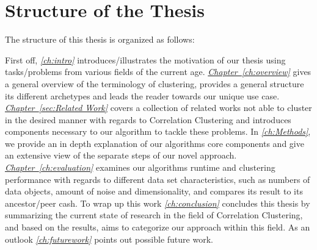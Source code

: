 \section{Structure of the Thesis}
The structure of this thesis is organized as follows:

First off, \textit{\autoref{ch:intro}} introduces/illustrates the motivation of our thesis using tasks/problems from various fields of the current age.
\textit{\hyperref[ch:overview]{Chapter~\ref*{ch:overview}}} gives a general overview of the terminology of clustering, provides a general structure its different archetypes and leads the reader towards our unique use case.
\textit{\hyperref[sec:Related Work]{Chapter~\ref*{sec:Related Work}}} covers a collection of related works not able to cluster in the desired manner with regards to Correlation Clustering and introduces components necessary to our algorithm to tackle these problems.
In \textit{\autoref{ch:Methods}}, we provide an in depth explanation of our algorithms core components and give an extensive view of the separate steps of our novel approach.
\textit{\hyperref[ch:evaluation]{Chapter~\ref*{ch:evaluation}}} examines our algorithms runtime and clustering performance with regards to different data set characteristics, such as numbers of data objects, amount of noise and dimensionality, and compares its result to its ancestor/peer \acrshort{cash}.
To wrap up this work \textit{\autoref{ch:conclusion}} concludes this thesis by summarizing the current state of research in the field of Correlation Clustering, and based on the results, aims to categorize our approach within this field. As an outlook \textit{\autoref{ch:futurework}} points out possible future work.


